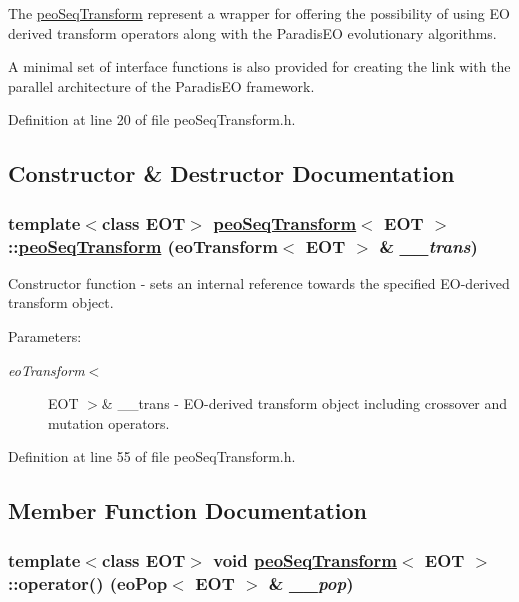 The \hyperlink{classpeoSeqTransform}{peo\-Seq\-Transform} represent a wrapper for offering the possibility of using EO derived transform operators along with the Paradis\-EO evolutionary algorithms. 

A minimal set of interface functions is also provided for creating the link with the parallel architecture of the Paradis\-EO framework. 



Definition at line 20 of file peo\-Seq\-Transform.h.

\subsection{Constructor \& Destructor Documentation}
\hypertarget{classpeoSeqTransform_3b8e4ed19d9458938eb669d83a53c626}{
\subsubsection[peoSeqTransform]{\setlength{\rightskip}{0pt plus 5cm}template$<$class EOT$>$ \hyperlink{classpeoSeqTransform}{peo\-Seq\-Transform}$<$ EOT $>$::\hyperlink{classpeoSeqTransform}{peo\-Seq\-Transform} (eo\-Transform$<$ EOT $>$ \& {\em \_\-\_\-trans})}}
\label{classpeoSeqTransform_3b8e4ed19d9458938eb669d83a53c626}


Constructor function - sets an internal reference towards the specified EO-derived transform object. 

\begin{Desc}
\item[Parameters:]
\begin{description}
\item[{\em eo\-Transform$<$}]EOT $>$\& \_\-\_\-trans - EO-derived transform object including crossover and mutation operators. \end{description}
\end{Desc}


Definition at line 55 of file peo\-Seq\-Transform.h.

\subsection{Member Function Documentation}
\hypertarget{classpeoSeqTransform_1ba63536abb6c4e1c369e0b7e066872e}{
\subsubsection[operator()]{\setlength{\rightskip}{0pt plus 5cm}template$<$class EOT$>$ void \hyperlink{classpeoSeqTransform}{peo\-Seq\-Transform}$<$ EOT $>$::operator() (eo\-Pop$<$ EOT $>$ \& {\em \_\-\_\-pop})}}
\label{classpeoSeqTransform_1ba63536abb6c4e1c369e0b7e066872e}


